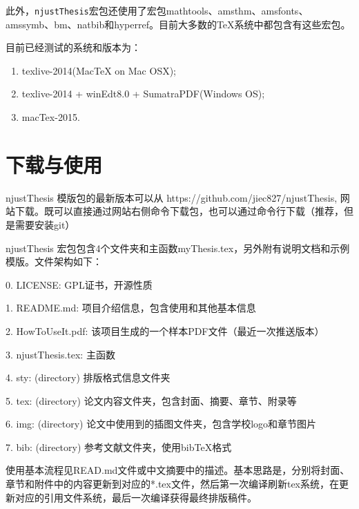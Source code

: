 此外，\texttt{njustThesis}宏包还使用了宏包mathtools、amsthm、amsfonts、amssymb、bm、natbib和hyperref。目前大多数的\TeX{}系统中都包含有这些宏包。

目前已经测试的系统和版本为：
\begin{enumerate}
\item texlive-2014(MacTeX on Mac OSX);

\item texlive-2014 + winEdt8.0 + SumatraPDF(Windows OS);

\item macTex-2015.

\end{enumerate}

{\color{blue}{其中，针对2014版本的texlive需要首先配置中文字库，详细方法可以自行百度；2015版本之后ctex已经在发行版内完成了中文字库的配置，可以直接进行编译。另外，使用前需要自行设置中文参考文献标准，参考bib目录下GBT7714-2005NLang压缩文件说明。}}

\section{下载与使用}
\label{sec:howtouse}
njustThesis 模版包的最新版本可以从 https://github.com/jiec827/njustThesis, 网站下载。既可以直接通过网站右侧命令下载包，也可以通过命令行下载（推荐，但是需要安装git）

\begin{center}
  {\color{blue}{git clone https://github.com/jiec827/njustThesis}}
\end{center}


njustThesis 宏包包含4个文件夹和主函数myThesis.tex，另外附有说明文档和示例模版。文件架构如下：

0. LICENSE: GPL证书，开源性质

1. README.md: 项目介绍信息，包含使用和其他基本信息

2. HowToUseIt.pdf: 该项目生成的一个样本PDF文件（最近一次推送版本）

3. njustThesis.tex: 主函数

4. sty: (directory) 排版格式信息文件夹

5. tex: (directory) 论文内容文件夹，包含封面、摘要、章节、附录等

6. img: (directory) 论文中使用到的插图文件夹，包含学校logo和章节图片

7. bib: (directory) 参考文献文件夹，使用bibTeX格式

使用基本流程见READ.md文件或中文摘要中的描述。基本思路是，分别将封面、章节和附件中的内容更新到对应的*.tex文件，然后第一次编译刷新tex系统，在更新对应的引用文件系统，最后一次编译获得最终排版稿件。

